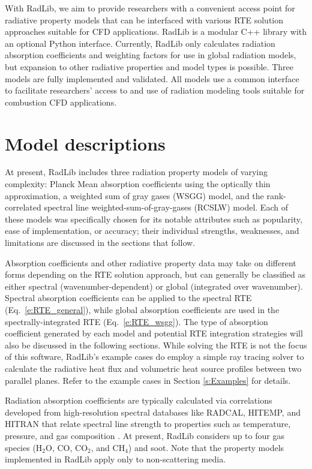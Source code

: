 \documentclass[preprint,12pt]{elsarticle}
\begin{document}
With RadLib, we aim to provide researchers with a convenient access point for radiative property models that can be interfaced with various RTE solution approaches suitable for CFD applications. RadLib is a modular C++ library with an optional Python interface. Currently, RadLib only calculates radiation absorption coefficients and weighting factors for use in global radiation models, but expansion to other radiative properties and model types is possible. Three models are fully implemented and validated. All models use a common interface to facilitate researchers' access to and use of radiation modeling tools suitable for combustion CFD applications.


\section{Model descriptions} \label{s:models}

At present, RadLib includes three radiation property models of varying complexity: Planck Mean absorption coefficients using the optically thin approximation, a weighted sum of gray gases (WSGG) model, and the rank-correlated spectral line weighted-sum-of-gray-gases (RCSLW) model. Each of these models was specifically chosen for its notable attributes such as popularity, ease of implementation, or accuracy; their individual strengths, weaknesses, and limitations are discussed in the sections that follow. 

Absorption coefficients and other radiative property data may take on different forms depending on the RTE solution approach, but can generally be classified as either spectral (wavenumber-dependent) or global (integrated over wavenumber). Spectral absorption coefficients can be applied to the spectral RTE (Eq.~\ref{e:RTE_general}), while global absorption coefficients are used in the spectrally-integrated RTE (Eq.~\ref{e:RTE_wsgg}). The type of absorption coefficient generated by each model and potential RTE integration strategies will also be discussed in the following sections. While solving the RTE is not the focus of this software, RadLib's example cases do employ a simple ray tracing solver to calculate the radiative heat flux and volumetric heat source profiles between two parallel planes. Refer to the example cases in Section \ref{s:Examples} for details. 

Radiation absorption coefficients are typically calculated via correlations developed from high-resolution spectral databases like RADCAL, HITEMP, and HITRAN \citep{Grosshandler_1993,Rothman_2010} that relate spectral line strength to properties such as temperature, pressure, and gas composition \citep{Zhang_2002b}. At present, RadLib considers up to four gas species (H$_2$O, CO, CO$_2$, and CH$_4$) and soot. Note that the property models implemented in RadLib apply only to non-scattering media. 
\end{document}
